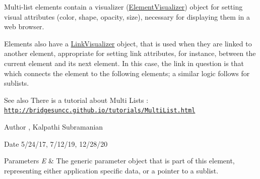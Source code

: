 Multi-\/list elements contain a visualizer (\hyperlink{classbridges_1_1datastructure_1_1_element_visualizer}{Element\+Visualizer}) object for setting visual attributes (color, shape, opacity, size), necessary for displaying them in a web browser.

Elements also have a \hyperlink{classbridges_1_1datastructure_1_1_link_visualizer}{Link\+Visualizer} object, that is used when they are linked to another element, appropriate for setting link attributes, for instance, between the current element and its next element. In this case, the link in question is that which connects the element to the following elements; a similar logic follows for sublists.

\begin{DoxySeeAlso}{See also}
There is a tutorial about Multi Lists \+: \href{http://bridgesuncc.github.io/tutorials/MultiList.html}{\tt http\+://bridgesuncc.\+github.\+io/tutorials/\+Multi\+List.\+html}
\end{DoxySeeAlso}
\begin{DoxyAuthor}{Author}
, Kalpathi Subramanian
\end{DoxyAuthor}
\begin{DoxyDate}{Date}
5/24/17, 7/12/19, 12/28/20
\end{DoxyDate}

\begin{DoxyParams}{Parameters}
{\em E} & The generic parameter object that is part of this element, representing either application specific data, or a pointer to a sublist. \\
\hline
\end{DoxyParams}

